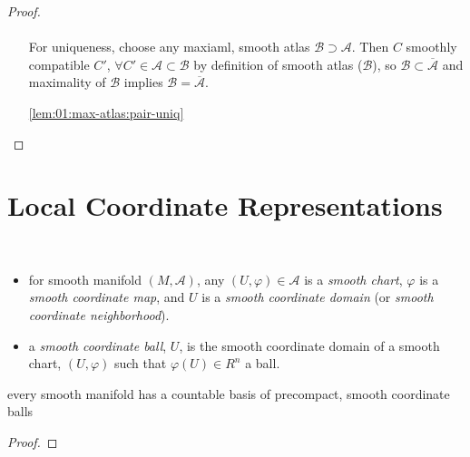 \begin{proof}
\begin{itemize}
    \paragraph{}
    For uniqueness, choose any maxiaml, smooth atlas
    $\mathscr B\supset\mathscr A$.
    Then $C$ smoothly compatible $C'$,
    $\forall C'\in\mathscr A\subset\mathscr B$
    by definition of smooth atlas ($\mathscr B$),
    so $\mathscr B\subset\overline{\mathscr A}$
    and maximality of $\mathscr B$ implies
    $\mathscr B=\overline{\mathscr A}$.
  \item[\ref{lem:01:max-atlas:pair-uniq}]
  \end{itemize}
\end{proof}

\section{Local Coordinate Representations}
\begin{defn}\
  \begin{itemize}
  \item
    for smooth manifold $(M, \mathscr A)$, any
    $(U,\varphi)\in\mathscr A$ is a \emph{smooth chart},
    $\varphi$ is a \emph{smooth coordinate map}, and
    $U$ is a \emph{smooth coordinate domain}
    (or \emph{smooth coordinate neighborhood}).
  \item
    a \emph{smooth coordinate ball}, $U$, is
    the smooth coordinate domain of a smooth chart,
    $(U, \varphi)$ such that $\varphi(U)\in R^n$ a ball.
  \end{itemize}
\end{defn}

\begin{lem}\label{lem:1.11}
  every smooth manifold has a countable basis
  of precompact, smooth coordinate balls
\end{lem}
\begin{proof}
\end{proof}

